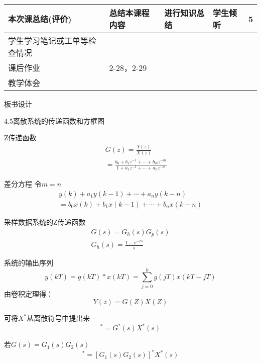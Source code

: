 {\begin{landscape}
\begin{longtable}{|m{10mm}|m{50mm}|m{50mm}|m{50mm}|m{15mm}|}
\centering 本次课总结(评价)&总结本课程内容 &进行知识总结 &学生倾听 &5 \\\hline
\centering 学生学习笔记或工单等检查情况&\multicolumn{4}{m{165mm}|}{\quad}\\\hline
\centering 课后作业&\multicolumn{4}{m{165mm}|}{2-28，2-29}\\\hline
\centering 教学体会&\multicolumn{4}{m{165mm}|}{\quad}\\
\end{longtable}

\end{landscape}
\clearpage
\begin{center}
{\huge 板书设计}
\end{center}
}

 \begin{frame}{4.5离散系统的传递函数和方框图} 
 \begin{block}{Z传递函数}
 \begin{eqnarray*}
&& G(z)=\frac{Y(z)}{X(z)}\\
 &&=\frac{b_0+b_1z^{-1}+\cdots +b_mz^{-m}}{1+a_1z^{-1}+\cdots +a_nz^{-n}}
 \end{eqnarray*}
 \end{block}
 \end{frame}
 
 \begin{frame}
 \begin{block}{差分方程}
 令$m=n$
\begin{eqnarray*}
y(k)+a_1y(k-1)+\cdots +a_ny(k-n)\\
=b_0x(k)+b_1x(k-1)+\cdots +b_nx(k-n)
\end{eqnarray*}
\end{block}
\begin{block}{采样数据系统的Z传递函数}
\begin{eqnarray*}
G(s)=G_h(s)G_p(s)\\
G_h(s)=\frac{1-e^{-Ts}}{s}
\end{eqnarray*}
\end{block}
\end{frame}

\begin{frame}
\begin{block}{系统的输出序列}
\[y(kT)=g(kT)*x(kT)=\sum_{j=0}^kg(jT)x(kT-jT)\]
由卷积定理得：
\[Y(z)=G(Z)X(Z)\]
\end{block}
\end{frame}

\begin{frame}
\begin{block}{可将$X^*$从离散符号中提出来}
\begin{equation*}
[G(s)X^*(s)]^*=G^*(s)X^*(s)
\end{equation*}
\end{block}
\begin{block}{若$G(s)=G_1(s)G_2(s)$}
\begin{equation*}
[G_1(s)G_2(s)X^*(s)]^*=[G_1(s)G_2(s)]^*X^*(s)
\end{equation*}
\end{block}
\end{frame}

